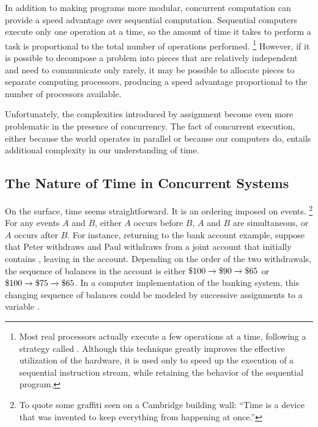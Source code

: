 In addition to making programs more modular, concurrent computation can provide a speed advantage over sequential computation.
Sequential computers execute only one operation at a time, so the amount of time it takes to perform a task is proportional to the total number of operations performed.%
\footnote{
	Most real processors actually execute a few operations at a time, following a strategy called .
	Although this technique greatly improves the effective utilization of the hardware, it is used only to speed up the execution of a sequential instruction stream, while retaining the behavior of the sequential program.
}
However, if it is possible to decompose a problem into pieces that are relatively independent and need to communicate only rarely, it may be possible to allocate pieces to separate computing processors, producing a speed advantage proportional to the number of processors available.

Unfortunately, the complexities introduced by assignment become even more problematic in the presence of concurrency.
The fact of concurrent execution, either because the world operates in parallel or because our computers do, entails additional complexity in our understanding of time.



\subsection{The Nature of Time in Concurrent Systems}
\label{Section 3.4.1}

On the surface, time seems straightforward.
It is an ordering imposed on events.%
\footnote{
	To quote some graffiti seen on a Cambridge building wall:
	“Time is a device that was invented to keep everything from happening at once.”
}
For any events \( A \) and \( B \), either \( A \) occurs before \( B \), \( A \) and \( B \) are simultaneous, or \( A \) occurs after \( B \).
For instance, returning to the bank account example, suppose that Peter withdraws  and Paul withdraws  from a joint account that initially contains , leaving  in the account.
Depending on the order of the two withdrawals, the sequence of balances in the account is either \( \$100 \to \$90 \to \$65 \) or \( \$100 \to \$75 \to \$65 \).
In a computer implementation of the banking system, this changing sequence of balances could be modeled by successive assignments to a variable .

